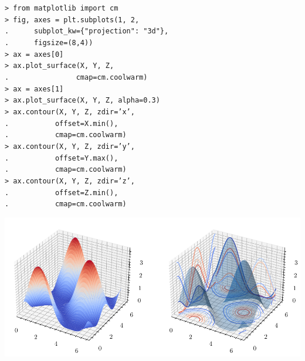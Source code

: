 \documentclass[8pt,a4paper,notitlepage]{scrartcl}
\newcommand{\codebox}[2]{\begin{tcolorbox}[
  colback=boxBG,
  colframe=boxFrame,
  coltitle=mainFont,
  coltext=mainFont,
  left=1pt,
  right=1pt,
  top=1pt,
  bottom=1pt,
  bottomtitle=0mm,
  toptitle=0mm,
  title=\textbf{#1},
  halign title=left, 
  after={\par}]
#2
\end{tcolorbox}}
\begin{document}
\begin{multicols}{3}
\codebox{3D Surface Plot}{
\color{codeFont}
\texttt{> from matplotlib import cm \\
> fig, axes = plt.subplots(1, 2, \\
. \ \ \ \ \ subplot\_kw=\{"projection":\ "3d"\}, \\
. \ \ \ \ \ figsize=(8,4))\\
> ax = axes[0] \\
> ax.plot\_surface(X, Y, Z, \\
. \ \ \ \ \ \ \ \ \ \ \ \ \ \ \ cmap=cm.coolwarm) \\
> ax = axes[1] \\
> ax.plot\_surface(X, Y, Z, alpha=0.3) \\
> ax.contour(X, Y, Z, zdir='x', \\
. \ \ \ \ \ \ \ \ \ \ offset=X.min(), \\
. \ \ \ \ \ \ \ \ \ \ cmap=cm.coolwarm) \\
> ax.contour(X, Y, Z, zdir='y', \\
. \ \ \ \ \ \ \ \ \ \ offset=Y.max(), \\
. \ \ \ \ \ \ \ \ \ \ cmap=cm.coolwarm) \\
> ax.contour(X, Y, Z, zdir='z', \\
. \ \ \ \ \ \ \ \ \ \ offset=Z.min(), \\
. \ \ \ \ \ \ \ \ \ \ cmap=cm.coolwarm) 
}
\color{mainFont}
\begin{center}
	\includegraphics[width=\textwidth]{fig-3d-surface.pdf}
\end{center}
}

\end{multicols}
\end{document}
